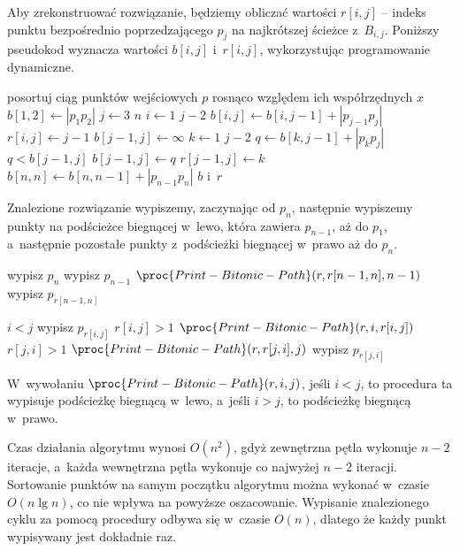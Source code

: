 Aby zrekonstruować rozwiązanie, będziemy obliczać wartości $r[i,j]$ -- indeks punktu bezpośrednio poprzedzającego $p_j$ na najkrótszej ścieżce z~$B_{i,j}$.
Poniższy pseudokod wyznacza wartości $b[i,j]$ i~$r[i,j]$, wykorzystując programowanie dynamiczne.
\begin{codebox}
\li	posortuj ciąg punktów wejściowych $p$ rosnąco względem ich współrzędnych $x$
\li	$b[1,2]\gets|p_1p_2|$
\li	\For $j\gets3$ \To $n$
\li		\Do \For $i\gets1$ \To $j-2$
\li			\Do $b[i,j]\gets b[i,j-1]+|p_{j-1}p_j|$
\li				$r[i,j]\gets j-1$
			\End
\li			$b[j-1,j]\gets\infty$
\li			\For $k\gets1$ \To $j-2$
\li				\Do $q\gets b[k,j-1]+|p_kp_j|$
\li					\If $q<b[j-1,j]$
\li						\Then $b[j-1,j]\gets q$
\li							$r[j-1,j]\gets k$
						\End
				\End
		\End
\li	$b[n,n]\gets b[n,n-1]+|p_{n-1}p_n|$
\li	\Return $b$ i~$r$
\end{codebox}

Znalezione rozwiązanie wypiszemy, zaczynając od $p_n$, następnie wypiszemy punkty na podścieżce biegnącej w~lewo, która zawiera $p_{n-1}$, aż do $p_1$, a~następnie pozostałe punkty z~podścieżki biegnącej w~prawo aż do $p_n$.
\begin{codebox}
\li	wypisz $p_n$
\li	wypisz $p_{n-1}$
\li	$\proc{Print-Bitonic-Path}(r,r[n-1,n],n-1)$
\li	wypisz $p_{r[n-1,n]}$
\end{codebox}
\begin{codebox}
\li	\If $i<j$
\li		\Then wypisz $p_{r[i,j]}$
\li			\If $r[i,j]>1$
\li				\Then $\proc{Print-Bitonic-Path}(r,i,r[i,j])$
				\End
\li		\Else \If $r[j,i]>1$
\li				\Then $\proc{Print-Bitonic-Path}(r,r[j,i],j)$
\li					wypisz $p_{r[j,i]}$
				\End
		\End
\end{codebox}
W~wywołaniu $\proc{Print-Bitonic-Path}(r,i,j)$, jeśli $i<j$, to procedura ta wypisuje podścieżkę biegnącą w~lewo, a~jeśli $i>j$, to podścieżkę biegnącą w~prawo.

Czas działania algorytmu  wynosi $O(n^2)$, gdyż zewnętrzna pętla wykonuje $n-2$ iteracje, a~każda wewnętrzna pętla wykonuje co najwyżej $n-2$ iteracji.
Sortowanie punktów na samym początku algorytmu można wykonać w~czasie $O(n\lg n)$, co nie wpływa na powyższe oszacowanie.
Wypisanie znalezionego cyklu za pomocą procedury  odbywa się w~czasie $O(n)$, dlatego że każdy punkt wypisywany jest dokładnie raz.
